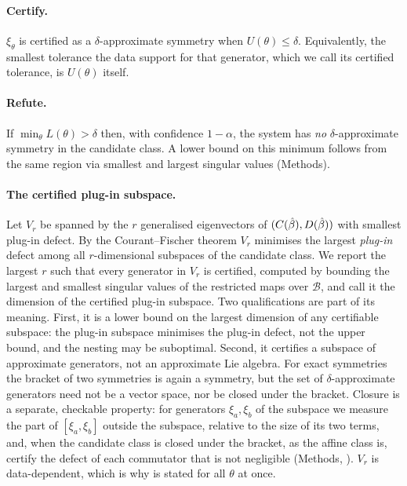 \paragraph{Certify.} $\xi_\theta$ is certified as a $\delta$-approximate
symmetry when $U(\theta) \le \delta$. Equivalently, the smallest tolerance the
data support for that generator, which we call its certified tolerance, is
$U(\theta)$ itself.

\paragraph{Refute.} If $\min_{\theta} L(\theta) > \delta$ then, with confidence
$1-\alpha$, the system has \emph{no} $\delta$-approximate symmetry in the
candidate class. A lower bound on this minimum follows from the same region via
smallest and largest singular values (Methods).

\paragraph{The certified plug-in subspace.} Let $V_r$ be spanned by the $r$
generalised eigenvectors of $(C(\hat{\beta}), D(\hat{\beta}))$ with smallest plug-in defect.
By the Courant--Fischer theorem $V_r$ minimises the largest \emph{plug-in}
defect among all $r$-dimensional subspaces of the candidate class. We report
the largest $r$ such that every generator in $V_r$ is certified, computed by
bounding the largest and smallest singular values of the restricted maps over
$\mathcal B$, and call it the dimension of the certified plug-in subspace. Two
qualifications are part of its meaning. First, it is a lower bound on the
largest dimension of any certifiable subspace: the plug-in subspace minimises
the plug-in defect, not the upper bound, and the nesting may be suboptimal.
Second, it certifies a subspace of approximate generators, not an approximate
Lie algebra. For exact symmetries the bracket of two symmetries is again a
symmetry, but the set of $\delta$-approximate generators need not be a vector
space, nor be closed under the bracket. Closure is a separate, checkable
property: for generators $\xi_a, \xi_b$ of the subspace we measure the part of
$[\xi_a,\xi_b]$ outside the subspace, relative to the size of its two terms,
and, when the candidate class is closed under the bracket, as the affine class
is, certify the defect of each commutator that is not negligible (Methods,
\STclosure). $V_r$ is data-dependent, which is why
 is stated for all $\theta$ at once.

